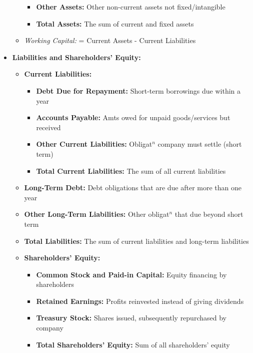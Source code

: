 \documentclass[10pt,landscape]{article}
\begin{document}
\begin{multicols*}{3}
\begin{itemize}[topsep=0pt,noitemsep,wide=0pt, leftmargin=\dimexpr{} + 2\relax]
\begin{itemize}[topsep=0pt,noitemsep,wide=0pt, leftmargin=\dimexpr{} + 2\relax]
\begin{itemize}[topsep=0pt,noitemsep,wide=0pt, leftmargin=\dimexpr{} + 2\relax]
            \item \textbf{Other Assets:} Other non-current assets not fixed/intangible
            \item \textbf{Total Assets:} The sum of current and fixed assets
        \end{itemize}
        \item \textit{Working Capital:} = Current Assets - Current Liabilities
    \end{itemize}
    \item \textbf{Liabilities and Shareholders' Equity:}
    \begin{itemize}[topsep=0pt,noitemsep,wide=0pt, leftmargin=\dimexpr{} + 2\relax]
        \item \textbf{Current Liabilities:}
        \begin{itemize}[topsep=0pt,noitemsep,wide=0pt, leftmargin=\dimexpr{} + 2\relax]
            \item \textbf{Debt Due for Repayment:} Short-term borrowings due within a year
            \item \textbf{Accounts Payable:} Amts owed for unpaid goods/services but received
            \item \textbf{Other Current Liabilities:} Obligat$^n$ company must settle (short term)
            \item \textbf{Total Current Liabilities:} The sum of all current liabilities
        \end{itemize}
        \item \textbf{Long-Term Debt:} Debt obligations that are due after more than one year
        \item \textbf{Other Long-Term Liabilities:} Other obligat$^n$ that due beyond short term
        \item \textbf{Total Liabilities:} The sum of current liabilities and long-term liabilities
        \item \textbf{Shareholders' Equity:}
        \begin{itemize}[topsep=0pt,noitemsep,wide=0pt, leftmargin=\dimexpr{} + 2\relax]
            \item \textbf{Common Stock and Paid-in Capital:} Equity financing by shareholders
            \item \textbf{Retained Earnings:} Profits reinvested instead of giving dividends
            \item \textbf{Treasury Stock:} Shares issued, subsequently repurchased by company
            \item \textbf{Total Shareholders' Equity:} Sum of all shareholders' equity
        \end{itemize}
    \end{itemize}
\end{itemize}


\end{multicols*}
\end{document}
